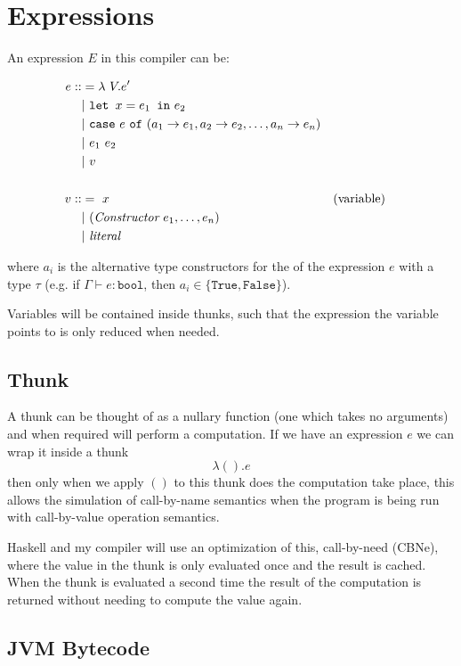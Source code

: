 \documentclass[12pt,a4paper,twoside]{article}
\begin{document}
\section{Expressions}

An expression $E$ in this compiler can be:

\begin{align*}
e ::&= \lambda\ V . e' \\
   &|\ \texttt{let } x = e_1 \texttt{ in} \ e_2\\ 
   &|\ \texttt{case}\ e \ \texttt{of} \ (a_1 \rightarrow e_1, a_2 \rightarrow e_2, \mathellipsis, a_n \rightarrow e_n)\\
   &|\ e_1\ e_2\\
   &|\ v\\\\
v ::&=\ x &&\text{(variable)}\\
   &|\ (\textit{Constructor}\ e_1, \mathellipsis, e_n )\\
   &|\ \textit{literal}
\end{align*}

where $a_i$ is the alternative type constructors for the of the expression $e$ with a type $\tau$
(e.g. if $\Gamma \vdash e : \texttt{bool}$, then $a_i \in \{ \texttt{True},  \texttt{False} \}$).


Variables will be contained inside thunks, such that the expression the variable points to is only reduced 
when needed.

\subsection{Thunk}

A thunk can be thought of as a nullary function (one which takes no arguments) and when required will 
perform a computation. If we have an expression $e$ we can wrap it inside a thunk \[ \lambda (). e \] then 
only when we apply $()$ to this thunk does the computation take place, this allows the
simulation of call-by-name semantics
when the program is being run with call-by-value operation semantics. 

Haskell and my compiler will use an optimization of this, call-by-need (CBNe), where the value in the thunk is only evaluated once and the 
result is cached. When the thunk is evaluated a second time the result of the computation is returned without needing to compute the value again.


\subsection{JVM Bytecode}
\end{document}
